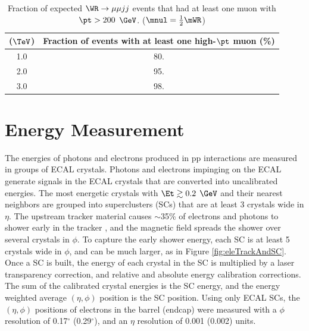\begin{table}[h]
	\caption{Fraction of expected $\WR \rightarrow \mu\mu jj$ events that had at least one muon with $\pt > 200$ $\GeV$. 
	($\mnul = \frac{1}{2}\mWR$)}
	\label{tab:wrHighPtMuons}
	\centering
	\begin{tabular}{c|c}
		\mWR ($\TeV$) & Fraction of events with at least one high-$\pt$ muon (\%) \\  \hline
		1.0 &  80.  \\
		2.0 &  95.  \\ 
		3.0 &  98.  \\ \hline
	\end{tabular}
\end{table}


\section{Energy Measurement}
\label{sec:enrgReco}
The energies of photons and electrons produced in pp interactions are measured in groups of ECAL crystals.  Photons and electrons 
impinging on the ECAL generate signals in the ECAL crystals that are converted into uncalibrated energies.  The most energetic crystals 
with $\Et \gtrsim 0.2$ $\GeV$ and their nearest neighbors are grouped into superclusters (SCs) that are at least 3 crystals wide in 
$\eta$.  The upstream tracker material causes $\sim$35\% of electrons and photons to shower early in the tracker 
\cite{trackerPerformanceInCollisions}, and the magnetic field spreads the shower over several crystals in $\phi$.  To capture the early 
shower energy, each SC is at least 5 crystals wide in $\phi$, and can be much larger, as in Figure \ref{fig:eleTrackAndSC}.  Once a SC 
is built, the energy of each crystal in the SC is multiplied by a laser transparency correction, and relative and absolute energy 
calibration corrections.  The sum of the calibrated crystal energies is the SC energy, and the energy weighted average $(\eta,\phi)$ 
position is the SC position.  Using only ECAL SCs, the $(\eta,\phi)$ positions of electrons in the barrel (endcap) were measured with 
a $\phi$ resolution of 0.17$^{\circ}$ (0.29$^{\circ}$), and an $\eta$ resolution of 0.001 (0.002) units.

